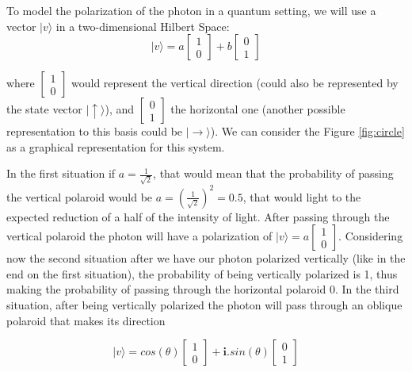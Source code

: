 To model the polarization of the photon in a quantum setting, we will use a vector $\vert v \rangle $ in a two-dimensional Hilbert Space: 
\begin{equation}
\vert v \rangle = a\left[\begin{array}{c}
1\\
0
\end{array}\right]+ b\left[\begin{array}{c}
0\\
1
\end{array}\right]
\end{equation}

where $\left[\begin{array}{c}
1\\
0
\end{array}\right]$ would represent the vertical direction (could also be represented by the state vector $\vert\uparrow\rangle$), and $\left[\begin{array}{c}
0\\
1
\end{array}\right] $ the horizontal one (another possible representation to this basis could be $\vert\rightarrow\rangle$). We can consider the Figure \ref{fig:circle} as a graphical representation for this system.

In the first situation if $a = \frac{1}{\sqrt{2}}$, that would mean that the probability of passing the vertical polaroid would be $a = (\frac{1}{\sqrt{2}})^{2} = 0.5$, that would light to the expected reduction of a half of the intensity of light. After passing through the vertical polaroid the photon will have a polarization of $\vert v \rangle = a\left[\begin{array}{c}
1\\
0
\end{array}\right]$. Considering now the second situation after we have our photon polarized vertically (like in the end on the first situation), the probability of being vertically polarized is 1, thus making the probability of passing through the horizontal polaroid 0.
In the third situation, after being vertically polarized the photon will pass through an oblique polaroid that makes its direction

\begin{equation}
\vert v \rangle =  cos(\theta)\left[\begin{array}{c}
1\\
0
\end{array}\right]+ \mathbf{i}.sin(\theta)\left[\begin{array}{c}
0\\
1
\end{array}\right]
\end{equation}



